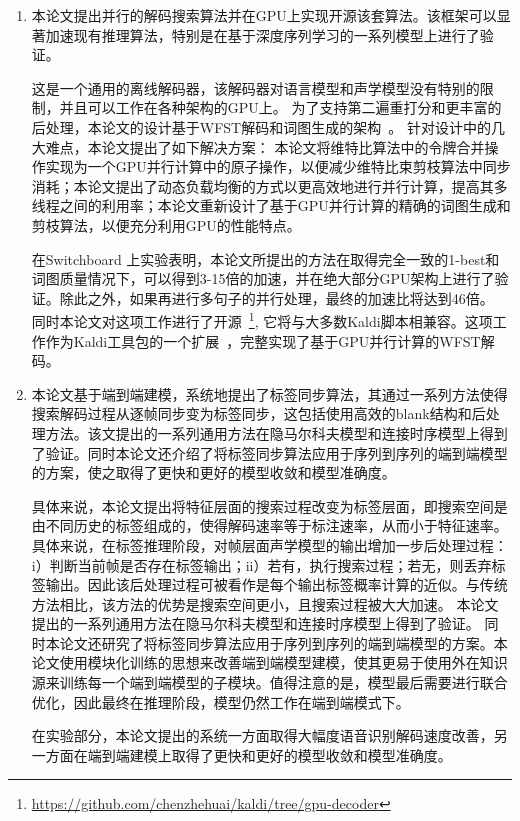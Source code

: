 \begin{enumerate}
    \item 
本论文提出并行的解码搜索算法并在GPU上实现开源该套算法。该框架可以显著加速现有推理算法，特别是在基于深度序列学习的一系列模型上进行了验证。

这是一个通用的离线解码器，该解码器对语言模型和声学模型没有特别的限制，并且可以工作在各种架构的GPU上。
为了支持第二遍重打分和更丰富的后处理，本论文的设计基于WFST解码和词图生成的架构~\cite{povey2012generating}。
针对设计中的几大难点，本论文提出了如下解决方案：
本论文将维特比算法中的令牌合并操作实现为一个GPU并行计算中的原子操作，以便减少维特比束剪枝算法中同步消耗；本论文提出了动态负载均衡的方式以更高效地进行并行计算，提高其多线程之间的利用率；本论文重新设计了基于GPU并行计算的精确的词图生成和剪枝算法，以便充分利用GPU的性能特点。

在Switchboard 上实验表明，本论文所提出的方法在取得完全一致的1-best和词图质量情况下，可以得到3-15倍的加速，并在绝大部分GPU架构上进行了验证。除此之外，如果再进行多句子的并行处理，最终的加速比将达到46倍。
同时本论文对这项工作进行了开源~\footnote{\url{https://github.com/chenzhehuai/kaldi/tree/gpu-decoder}},
它将与大多数Kaldi脚本相兼容。这项工作作为Kaldi工具包的一个扩展~\cite{povey2011kaldi}，完整实现了基于GPU并行计算的WFST解码。

\item 本论文基于端到端建模，系统地提出了标签同步算法，其通过一系列方法使得搜索解码过程从逐帧同步变为标签同步，这包括使用高效的blank结构和后处理方法。该文提出的一系列通用方法在隐马尔科夫模型和连接时序模型上得到了验证。同时本论文还介绍了将标签同步算法应用于序列到序列的端到端模型的方案，使之取得了更快和更好的模型收敛和模型准确度。

具体来说，本论文提出将特征层面的搜索过程改变为标签层面，即搜索空间是由不同历史的标签组成的，使得解码速率等于标注速率，从而小于特征速率。具体来说，在标签推理阶段，对帧层面声学模型的输出增加一步后处理过程：i）判断当前帧是否存在标签输出；ii）若有，执行搜索过程；若无，则丢弃标签输出。因此该后处理过程可被看作是每个输出标签概率计算的近似。与传统方法相比，该方法的优势是搜索空间更小，且搜索过程被大大加速。
本论文提出的一系列通用方法在隐马尔科夫模型和连接时序模型上得到了验证。
%
同时本论文还研究了将标签同步算法应用于序列到序列的端到端模型的方案。本论文使用模块化训练的思想来改善端到端模型建模，使其更易于使用外在知识源来训练每一个端到端模型的子模块。值得注意的是，模型最后需要进行联合优化，因此最终在推理阶段，模型仍然工作在端到端模式下。

在实验部分，本论文提出的系统一方面取得大幅度语音识别解码速度改善，另一方面在端到端建模上取得了更快和更好的模型收敛和模型准确度。


\end{enumerate}
